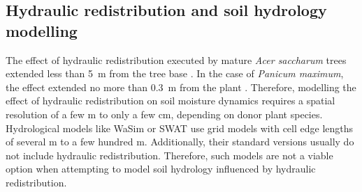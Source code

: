 \subsection{Hydraulic redistribution and soil hydrology modelling}

The effect of hydraulic redistribution executed by mature \emph{Acer saccharum} trees extended less than \SI{5}{\metre} from the tree base \parencite{dawson_hydraulic_1993}.  In the case of \emph{Panicum maximum}, the effect extended no more than \SI{0.3}{\metre} from the plant \parencite{sekiya_applying_2011}.  Therefore, modelling the effect of hydraulic redistribution on soil moisture dynamics requires a spatial resolution of a few \si{\metre} to only a few \si{\centi\metre}, depending on donor plant species.  Hydrological models like WaSim \parencite{schulla_hydrologische_1997} or SWAT \parencite{arnold_large_1998} use grid models with cell edge lengths of several \si{\metre} to a few hundred \si{\metre}.  Additionally, their standard versions usually do not include hydraulic redistribution.  Therefore, such models are not a viable option when attempting to model soil hydrology influenced by hydraulic redistribution.

